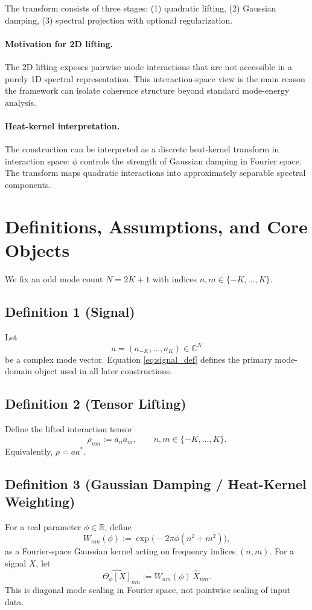 \documentclass[11pt]{article}
\newcommand{\C}{\mathbb{C}}
\newcommand{\R}{\mathbb{R}}
\begin{document}
The transform consists of three stages: (1) quadratic lifting, (2) Gaussian damping, (3) spectral projection with optional regularization.

\paragraph{Motivation for 2D lifting.}
The 2D lifting exposes pairwise mode interactions that are not accessible in a purely 1D spectral representation. This interaction-space view is the main reason the framework can isolate coherence structure beyond standard mode-energy analysis.

\paragraph{Heat-kernel interpretation.}
The construction can be interpreted as a discrete heat-kernel transform in interaction space: $\phi$ controls the strength of Gaussian damping in Fourier space.
The transform maps quadratic interactions into approximately separable spectral components.

\section{Definitions, Assumptions, and Core Objects}
We fix an odd mode count $N=2K+1$ with indices $n,m\in\{-K,\dots,K\}$.

\subsection*{Definition 1 (Signal)}
Let
\begin{equation}
a=(a_{-K},\dots,a_K)\in\C^N
\label{eq:signal_def}
\end{equation}
be a complex mode vector.
Equation \eqref{eq:signal_def} defines the primary mode-domain object used in all later constructions.

\subsection*{Definition 2 (Tensor Lifting)}
Define the lifted interaction tensor
\begin{equation}
\rho_{nm}:=a_n\overline{a_m},\qquad n,m\in\{-K,\dots,K\}.
\label{eq:rho_def}
\end{equation}
Equivalently, $\rho=aa^{\ast}$.

\subsection*{Definition 3 (Gaussian Damping / Heat-Kernel Weighting)}
For a real parameter $\phi\in\R$, define
\begin{equation}
W_{nm}(\phi):=\exp\!\big(-2\pi\phi(n^2+m^2)\big),
\label{eq:weight_def}
\end{equation}
as a Fourier-space Gaussian kernel acting on frequency indices $(n,m)$.
For a signal $X$, let
\begin{equation}
\widehat{\Theta_{\phi}[X]}_{nm}:=W_{nm}(\phi)\,\widehat{X}_{nm}.
\label{eq:rho_weighted}
\end{equation}
This is diagonal mode scaling in Fourier space, not pointwise scaling of input data.
\end{document}
